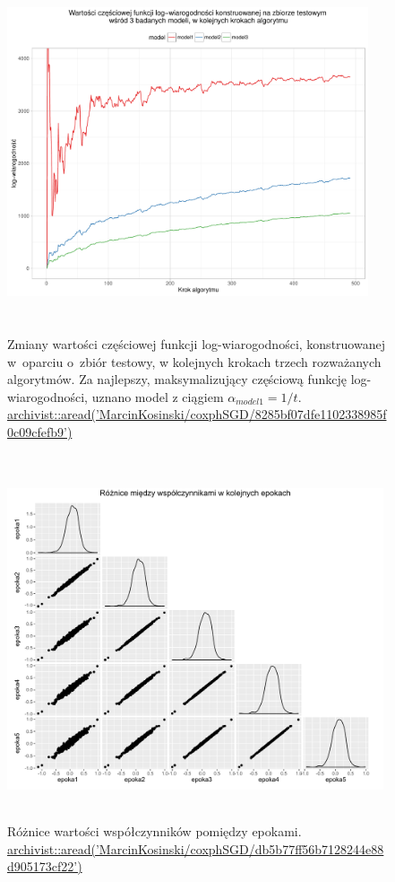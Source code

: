 \begin{figure}[!ht]
\centering
\includegraphics[width=0.95\textwidth, height = 280pt]{Obrazki/analiza/fig10.pdf}
\caption{\label{wykres5} Zmiany wartości częściowej funkcji log-wiarogodności, konstruowanej w~oparciu o~zbiór testowy, w kolejnych krokach trzech rozważanych algorytmów. Za najlepszy, maksymalizujący częściową funkcję log-wiarogodności, uznano model z ciągiem $\alpha_{model1} = 1/t$. \\
\href{https://github.com/MarcinKosinski/coxphSGD/blob/master/gallery/8285bf07dfe1102338985f0c09cfefb9.rda?raw=true}{archivist::aread('MarcinKosinski/coxphSGD/8285bf07dfe1102338985f0c09cfefb9')}}
\ \\
\includegraphics[width=0.99\textwidth, height = 280pt]{Obrazki/analiza/ggpairs_2.pdf}
\caption{\label{wykres6} Różnice wartości współczynników pomiędzy epokami. \\
\href{https://github.com/MarcinKosinski/coxphSGD/blob/master/gallery/db5b77ff56b7128244e88d905173cf22.rda?raw=true}{archivist::aread('MarcinKosinski/coxphSGD/db5b77ff56b7128244e88d905173cf22')}}
\end{figure}

